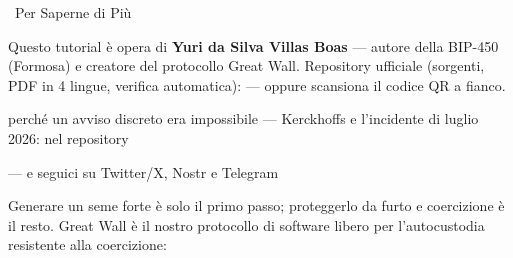 \documentclass[10pt]{article}
\begin{document}
\begin{infobox}{\faInfoCircle~Per Saperne di Più}
\begin{minipage}[c]{0.8\textwidth}
Questo tutorial è opera di \textbf{Yuri da Silva Villas Boas} --- autore della BIP-450 (Formosa) e creatore del protocollo Great Wall. Repository ufficiale (sorgenti, PDF in 4 lingue, verifica automatica): \repolink --- oppure scansiona il codice QR a fianco.

\begin{description}[itemsep=1pt]
 \item [Articolo breve:] perché un avviso discreto era impossibile --- Kerckhoffs e l'incidente di luglio 2026: \paperlink nel repository
 \item [Altri tutorial, corsi e comunità:] \sitelink --- e seguici su Twitter/X, Nostr e Telegram
 \item [Great Wall:] Generare un seme forte è solo il primo passo; proteggerlo da furto e coercizione è il resto. Great Wall è il nostro protocollo di software libero per l'autocustodia resistente alla coercizione: \gwlink
\end{description}

\end{minipage}%
\hfill
\begin{minipage}[c]{0.15\textwidth}
\centering
\repoqr
\end{minipage}
\end{infobox}

\end{document}
